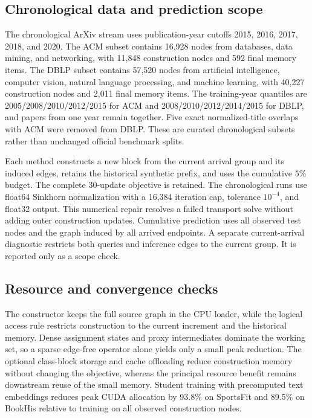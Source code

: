\subsection{Chronological data and prediction scope}

The chronological ArXiv stream uses publication-year cutoffs 2015, 2016,
2017, 2018, and 2020. The ACM subset contains 16,928 nodes from databases,
data mining, and networking, with 11,848 construction nodes and 592 final
memory items. The DBLP subset contains 57,520 nodes from artificial
intelligence, computer vision, natural language processing, and machine
learning, with 40,227 construction nodes and 2,011 final memory items. The
training-year quantiles are 2005/2008/2010/2012/2015 for ACM and
2008/2010/2012/2014/2015 for DBLP, and papers from one year remain together.
Five exact normalized-title overlaps with ACM were removed from DBLP. These
are curated chronological subsets rather than unchanged official benchmark
splits.

Each method constructs a new block from the current arrival group and its
induced edges, retains the historical synthetic prefix, and uses the
cumulative $5\%$ budget. The complete 30-update objective is retained. The
chronological runs use float64 Sinkhorn normalization with a 16,384 iteration
cap, tolerance $10^{-4}$, and float32 output. This numerical repair resolves a
failed transport solve without adding outer construction updates. Cumulative
prediction uses all observed test nodes and the graph induced by all arrived
endpoints. A separate current-arrival diagnostic restricts both queries and
inference edges to the current group. It is reported only as a scope check.

\subsection{Resource and convergence checks}

The constructor keeps the full source graph in the CPU loader, while the
logical access rule restricts construction to the current increment and the
historical memory. Dense assignment states and proxy intermediates dominate
the working set, so a sparse edge-free operator alone yields only a small
peak reduction. The optional class-block storage and cache offloading reduce
construction memory without changing the objective, whereas the principal
resource benefit remains downstream reuse of the small memory. Student
training with precomputed text embeddings reduces peak CUDA allocation by
93.8\% on SportsFit and 89.5\% on BookHis relative to training on all
observed construction nodes.

